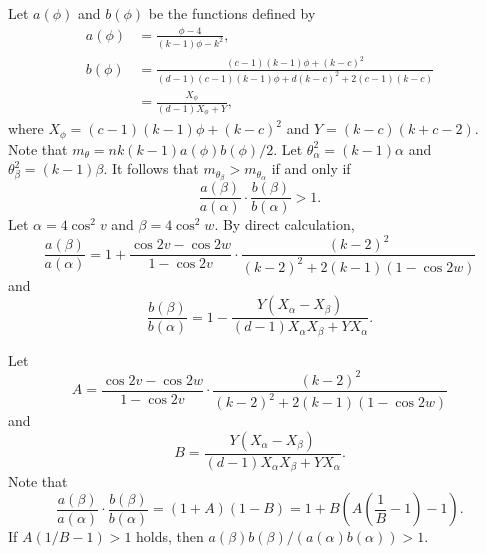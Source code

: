 \documentclass[ALCO,ThmDefs,Unicode,epreuves]{cedram}
\begin{document}
Let $a(\phi)$ and $b(\phi)$ be the functions defined by
\begin{align*}
a(\phi)&= \frac{\phi -4}{(k-1) \phi - k^2}, \\
b(\phi)&= \frac{(c-1)(k-1)\phi+(k-c)^2}{(d-1)(c-1)(k-1)\phi+d(k-c)^2+2(c-1)(k-c)}\\
&=\frac{X_\phi}{(d-1)X_\phi+Y},
\end{align*} 
where $X_\phi=(c-1)(k-1)\phi+(k-c)^2$ and $Y=(k-c)(k+c-2)$. 
Note that $m_\theta=nk(k-1)a(\phi) b(\phi)/2$. 
Let $\theta_\alpha^2=(k-1) \alpha$ and 
$\theta_\beta^2=(k-1) \beta$. 
It follows that $m_{\theta_\beta}>m_{\theta_\alpha}$ if and only if 
\[
\frac{a(\beta)}{a(\alpha)}\cdot \frac{b(\beta)}{b(\alpha)}>1. 
\]
Let $\alpha=4 \cos^2 v$ and $\beta=4 \cos^2 w$. By direct calculation, 
\[
\frac{a(\beta)}{a(\alpha)}= 
1+ \frac{\cos 2v-\cos 2w}{1-\cos 2v} \cdot \frac{(k-2)^2}{(k-2)^2+2(k-1)(1-\cos 2w) } 
\]
and
\[
\frac{b(\beta)}{b(\alpha)}=1-\frac{Y(X_\alpha-X_\beta)} 
 {(d-1)X_\alpha X_\beta+Y X_\alpha}.
\]

Let 
\[
A=\frac{\cos 2v-\cos 2w}{1-\cos 2v} \cdot \frac{(k-2)^2}{(k-2)^2+2(k-1)(1-\cos 2w) } 
\]
and 
\[
B=\frac{Y(X_\alpha-X_\beta)} 
 {(d-1)X_\alpha X_\beta+Y X_\alpha}.
\]
Note that 
\[
\frac{a(\beta)}{a(\alpha)}\cdot \frac{b(\beta)}{b(\alpha)}=(1+A)(1-B)=1+B\left( A\left(\frac{1}{B}-1\right)-1\right). 
\]
If $A(1/B-1)>1$ holds, then $a(\beta)b(\beta)/(a(\alpha)b(\alpha))>1$. 
\end{document}
